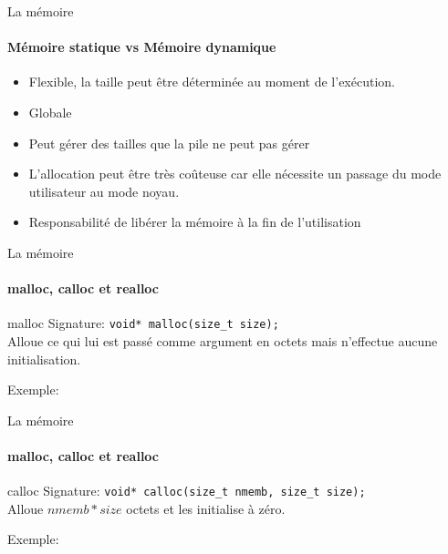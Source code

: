 \documentclass{beamer}
\begin{document}
\begin{darkframes}
  	\begin{frame}{La mémoire}
  		\framesubtitle{Mémoire statique vs Mémoire dynamique}
  		\begin{itemize}
  			\item Flexible, la taille peut être déterminée au moment de l'exécution.
  			\item Globale
  			\item Peut gérer des tailles que la pile ne peut pas gérer
  			\item L'allocation peut être très coûteuse car elle nécessite un passage du mode utilisateur au mode noyau.
  			\item Responsabilité de libérer la mémoire à la fin de l'utilisation
  		\end{itemize}
  	\end{frame}


  	\begin{frame}{La mémoire}
  		\framesubtitle{malloc, calloc et realloc}
  		\begin{block}{malloc}
  			Signature: \texttt{void* malloc(size\_t size);} \\
  			Alloue ce qui lui est passé comme argument en octets mais \alert{n'effectue aucune initialisation}.
  		\end{block}
  		\begin{exampleblock}{Exemple:}
  			\mallocExample
  		\end{exampleblock}
    \end{frame}

	\begin{frame}{La mémoire}
		\framesubtitle{malloc, calloc et realloc}
		\begin{block}{calloc}
			\alert{Signature}: \texttt{void* calloc(size\_t nmemb, size\_t size);} \\
			Alloue $nmemb * size$ octets et les initialise à zéro.
		\end{block}
		\begin{exampleblock}{Exemple:}
			\callocExample
		\end{exampleblock}
	\end{frame}


\end{darkframes}
\end{document}
